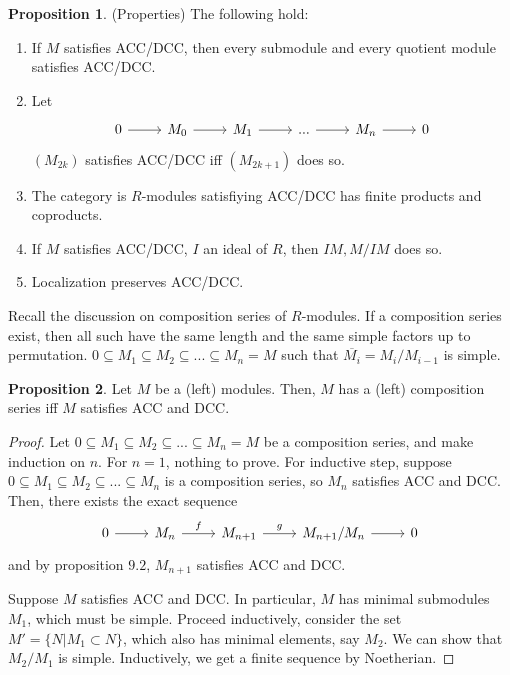 \documentclass{article}
\theoremstyle{definition}
\theoremstyle{definition}
\theoremstyle{definition}
\newtheorem{proposition}{Proposition}[section]
\theoremstyle{definition}
\theoremstyle{definition}
\theoremstyle{definition}
\theoremstyle{definition}
\begin{document}
\begin{tcolorbox}[colback=blue!5!white,colframe=blue!30!white]
\begin{proposition}
(Properties) The following hold:
\begin{enumerate}
    \item If $M$ satisfies ACC/DCC, then every submodule and every quotient module satisfies ACC/DCC.
    \item Let \[\begin{tikzcd}
    0\arrow[r]&M_0\arrow[r]&M_1\arrow[r]&...\arrow[r]&M_n\arrow[r]&0
    \end{tikzcd}\]
   $(M_{2k})$ satisfies ACC/DCC iff $(M_{2k+1})$ does so.
    \item The category is $R$-modules satisfiying ACC/DCC has finite products and coproducts. 
    \item If $M$ satisfies ACC/DCC, $I$ an ideal of $R$, then $IM, M/IM$ does so.
    \item Localization preserves ACC/DCC. 
 \end{enumerate}
\end{proposition}
\end{tcolorbox}

Recall the discussion on composition series of $R$-modules. If a composition series exist, then all such have the same length and the same simple factors up to permutation. $0\subseteq M_1\subseteq M_2\subseteq ...\subseteq M_n=M$ such that $\overline{M_i}=M_i/M_{i-1}$ is simple. 


\begin{tcolorbox}[colback=blue!5!white,colframe=blue!30!white]
\begin{proposition}
Let $M$ be a (left) modules. Then, $M$ has a (left) composition series iff $M$ satisfies ACC and DCC. 
\end{proposition}
\end{tcolorbox}
\begin{proof}
    Let $0\subseteq M_1\subseteq M_2\subseteq ...\subseteq M_n=M$ be a composition series, and make induction on $n$. For $n=1$, nothing to prove. For inductive step, suppose $0\subseteq M_1\subseteq M_2\subseteq ...\subseteq M_n$ is a composition series, so $M_n$ satisfies ACC and DCC. Then, there exists the exact sequence 
    \[\begin{tikzcd}
    0\arrow[r]&M_n\arrow[r,"f"]&M_{n+1}\arrow[r,"g"]&M_{n+1}/M_n\arrow[r]&0
    \end{tikzcd}\]
    and by proposition $9.2$, $M_{n+1}$ satisfies ACC and DCC. 


    Suppose $M$ satisfies ACC and DCC. In particular, $M$ has minimal submodules $M_1$, which must be simple. Proceed inductively, consider the set $M'=\{N|M_1\subset N\}$, which also has minimal elements, say $M_2$. We can show that $M_2/M_1$ is simple. Inductively, we get a finite sequence by Noetherian. 
\end{proof}
\end{document}
